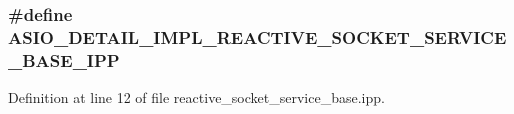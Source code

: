 \subsubsection[{A\+S\+I\+O\+\_\+\+D\+E\+T\+A\+I\+L\+\_\+\+I\+M\+P\+L\+\_\+\+R\+E\+A\+C\+T\+I\+V\+E\+\_\+\+S\+O\+C\+K\+E\+T\+\_\+\+S\+E\+R\+V\+I\+C\+E\+\_\+\+B\+A\+S\+E\+\_\+\+I\+P\+P}]{\setlength{\rightskip}{0pt plus 5cm}\#define A\+S\+I\+O\+\_\+\+D\+E\+T\+A\+I\+L\+\_\+\+I\+M\+P\+L\+\_\+\+R\+E\+A\+C\+T\+I\+V\+E\+\_\+\+S\+O\+C\+K\+E\+T\+\_\+\+S\+E\+R\+V\+I\+C\+E\+\_\+\+B\+A\+S\+E\+\_\+\+I\+P\+P}\label{reactive__socket__service__base_8ipp_a80eeb85969515f9640b6bb61a95a135d}


Definition at line 12 of file reactive\+\_\+socket\+\_\+service\+\_\+base.\+ipp.

